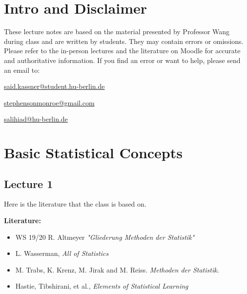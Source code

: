 \documentclass[open=any, 11pt,paper=A4]{scrreprt}
\begin{document}

\chapter{Intro and Disclaimer}\label{ch:intro}

These lecture notes are based on the material presented by Professor Wang during class and are written by students. They may contain errors or omissions. Please refer to the in-person lectures and the literature on Moodle for accurate and authoritative information. 
If you find an error or want to help, please send an email to:
\begin{center}
    \href{mailto:said.kassner@student.hu-berlin.de}{said.kassner@student.hu-berlin.de}
\end{center}

\begin{center}
    \href{mailto:stephensonmonroe@gmail.com}{stephensonmonroe@gmail.com}
\end{center}

\begin{center}
    \href{mailto:salihiad@hu-berlin.de}{salihiad@hu-berlin.de}
\end{center}




\chapter{Basic Statistical Concepts}\label{ch:intro}

\section*{Lecture 1}
Here is the literature that the class is based on.

\textbf{Literature:}
\begin{itemize}
    \item WS 19/20 R. Altmeyer \textit{"Gliederung Methoden der Statistik"}
    \item L. Wasserman, \textit{All of Statistics}
    \item M. Trabs, K. Krenz, M. Jirak and M. Reiss. \textit{Methoden der Statistik.}
    \item Hastie, Tibshirani, et al., \textit{Elements of Statistical Learning}
\end{itemize}
\end{document}
